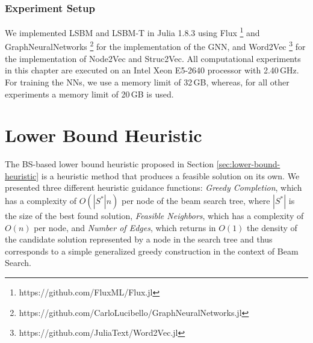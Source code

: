 \documentclass[draft,final]{vutinfth} %
\begin{document}
\subsubsection{Experiment Setup}
We implemented LSBM and LSBM-T in Julia 1.8.3 using Flux \footnote{https://github.com/FluxML/Flux.jl} and GraphNeuralNetworks \footnote{https://github.com/CarloLucibello/GraphNeuralNetworks.jl}\cite{Lucibello2021GNN} for the implementation of the GNN, and Word2Vec \footnote{https://github.com/JuliaText/Word2Vec.jl} for the implementation of Node2Vec and Struc2Vec. All computational experiments in this chapter are executed on an Intel Xeon E5-2640 processor with 2.40\,GHz. For training the NNs, we use a memory limit of 32\,GB, whereas, for all other experiments a memory limit of 20\,GB is used. 



\section{Lower Bound Heuristic}\label{sec:lbh}
The BS-based lower bound heuristic proposed in Section \ref{sec:lower-bound-heuristic} is a heuristic method that produces a feasible solution on its own. We presented three different heuristic guidance functions: \emph{Greedy Completion}, which has a complexity of $O(|S^*|n)$ per node of the beam search tree, where $|S^*|$ is the size of the best found solution, \emph{Feasible Neighbors}, which has a complexity of $O(n)$ per node, and \emph{Number of Edges}, which returns in $O(1)$ the density of the candidate solution represented by a node in the search tree and thus corresponds to a simple generalized greedy construction in the context of Beam Search. 
\end{document}
